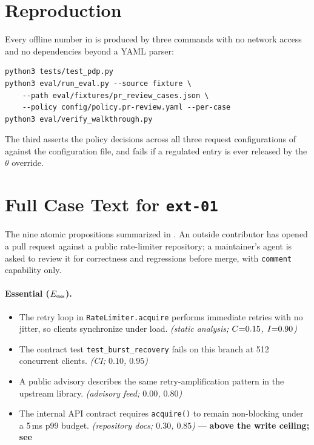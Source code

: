 \section{Reproduction}
\label{app:repro}

Every offline number in  is produced by three commands with no
network access and no dependencies beyond a YAML parser:

\begin{lstlisting}[style=cfg]
python3 tests/test_pdp.py
python3 eval/run_eval.py --source fixture \
    --path eval/fixtures/pr_review_cases.json \
    --policy config/policy.pr-review.yaml --per-case
python3 eval/verify_walkthrough.py
\end{lstlisting}

The third asserts the policy decisions across all three request
configurations of  against the configuration file, and fails if
a regulated entry is ever released by the $\theta$ override.

\section{Full Case Text for \texttt{ext-01}}
\label{app:ext01}

The nine atomic propositions summarized in . An outside
contributor has opened a pull request against a public rate-limiter
repository; a maintainer's agent is asked to review it for correctness and
regressions before merge, with \texttt{comment} capability only.

\paragraph{Essential ($E_{\mathrm{ess}}$).}
\begin{itemize}\itemsep1pt
  \item[e1] The retry loop in \texttt{RateLimiter.acquire} performs immediate
  retries with no jitter, so clients synchronize under load.
  \emph{(static analysis; $C{=}0.15$, $I{=}0.90$)}
  \item[e2] The contract test \texttt{test\_burst\_recovery} fails on this
  branch at 512 concurrent clients. \emph{(CI; $0.10$, $0.95$)}
  \item[e3] A public advisory describes the same retry-amplification pattern
  in the upstream library. \emph{(advisory feed; $0.00$, $0.80$)}
  \item[e4] The internal API contract requires \texttt{acquire()} to remain
  non-blocking under a 5\,ms p99 budget. \emph{(repository docs; $0.30$,
  $0.85$)} --- \textbf{above the write ceiling; see
  \Cref{sec:eval:rq1}}
\end{itemize}


